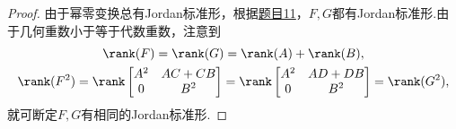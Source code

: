 \begin{proof}
	由于幂零变换总有Jordan标准形，根据\hyperlink{JordanOfQuotient}{题目11}，$F,G$都有Jordan标准形.由于几何重数小于等于代数重数，注意到
	\begin{gather*}
		\rank(F)=\rank(G)=\rank(A)+\rank(B),\\
		\rank(F^2)=\rank\begin{bmatrix}
			A^2 & AC+CB \\
			0   & B^2
		\end{bmatrix}=\rank\begin{bmatrix}
			A^2 & AD+DB \\
			0   & B^2
		\end{bmatrix}=\rank(G^2),
	\end{gather*}
	就可断定$F,G$有相同的Jordan标准形.
\end{proof}
